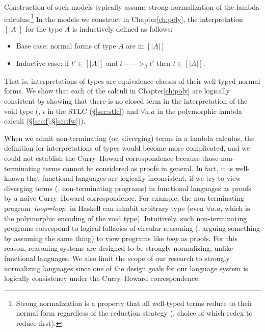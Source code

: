 Construction of such models typically assume strong normalization of
the lambda calculus.\footnote{Strong normalization is a property that
all well-typed terms reduce to their normal form regardless of
the reduction strategy (\ie, choice of which redex to reduce first).}
In the models we construct in Chapter\;\ref{ch:poly},
the interpretation $[| A |]$ for the type $A$ is inductively defined as follows:
\begin{itemize}
	\item Base case: normal forms of type $A$ are in $[| A |]$
	\item Inductive case: if $t' \in [| A |]$ and $t -->_\beta t'$
		then $t \in [| A |]$.
\end{itemize}
That is, interpretations of types are equivalence classes of their
well-typed normal forms.
We show that each of the calculi in Chapter\;\ref{ch:poly} are
logically consistent by showing that there is no closed term
in the interpretation of the void type
(\ie, $\iota$ in the STLC (\S\ref{sec:stlc}) and $\forall a.a$ in
the polymorphic lambda calculi (\S\ref{sec:f},\S\ref{sec:fw})).

When we admit non-terminating (or, diverging) terms in a lambda calculus,
the definition for interpretations of types would become more complicated,
and we could not establish the Curry--Howard correspondence because those
non-terminating terms cannot be considered as proofs in general. In fact,
it is well-known that functional languages are logically inconsistent,
if we try to view diverging terms (\ie, non-terminating programs)
in functional languages as proofs by a naive Curry--Howard correspondence.
For example, the non-terminating program $\textit{loop} = \textit{loop}$
in Haskell can inhabit arbitrary type (even $\forall a.a$,
which is the polymorphic encoding of the void type). Intuitively, such
non-terminating programs correspond to logical fallacies of
circular reasoning (\ie, arguing something by assuming the same thing)
to view programs like \textit{loop} as proofs. For this reason,
reasoning systems are designed to be strongly normalizing, unlike
functional languages. We also limit the scope of our research to
strongly normalizing languages since one of the design goals for our language
system is logically consistency under the Curry--Howard correspondence.


